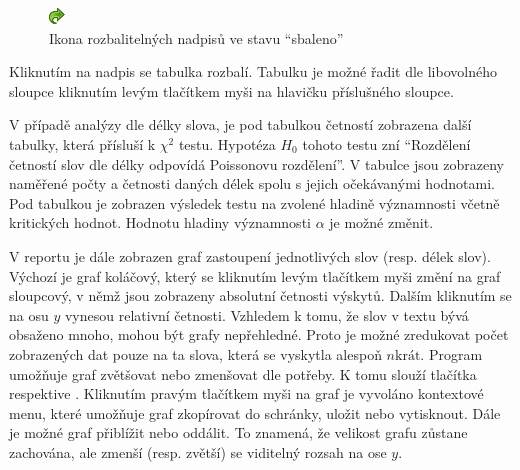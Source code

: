 \documentclass[dp.tex]{subfiles}
\begin{document}
\begin{figure}[H]
\centering
\includegraphics[max width=\textwidth,keepaspectratio=true]{imgs-60-aplikace/gui-toggle-healine}
\caption{Ikona rozbalitelných nadpisů ve stavu \enquote{sbaleno}}
\label{fig:gui-toggle-healine}
\end{figure}

Kliknutím na nadpis se tabulka rozbalí. Tabulku je možné řadit dle libovolného sloupce kliknutím levým tlačítkem myši na hlavičku příslušného sloupce.

V případě analýzy dle délky slova, je pod tabulkou četností zobrazena další tabulky, která přísluší k $\chi^2$ testu. Hypotéza $H_0$ tohoto testu zní \enquote{Rozdělení četností slov dle délky odpovídá Poissonovu rozdělení}. V tabulce jsou zobrazeny naměřené počty a četnosti daných délek spolu s jejich očekávanými hodnotami. Pod tabulkou je zobrazen výsledek testu na zvolené hladině významnosti včetně kritických hodnot. Hodnotu hladiny významnosti  $\alpha$ je možné změnit.

V reportu je dále zobrazen graf zastoupení jednotlivých slov (resp. délek slov). Výchozí je graf koláčový, který se kliknutím levým tlačítkem myši změní na graf sloupcový, v němž jsou zobrazeny absolutní četnosti výskytů. Dalším kliknutím se na osu $y$ vynesou relativní četnosti. Vzhledem k tomu, že slov v textu bývá obsaženo mnoho, mohou být grafy nepřehledné. Proto je možné zredukovat počet zobrazených dat pouze na ta slova, která se vyskytla alespoň $n\text{krát}$. Program umožňuje graf zvětšovat nebo zmenšovat dle potřeby. K tomu slouží tlačítka  respektive . Kliknutím pravým tlačítkem myši na graf je vyvoláno kontextové menu, které umožňuje graf zkopírovat do schránky, uložit nebo vytisknout. Dále je možné graf přiblížit nebo oddálit. To znamená, že velikost grafu zůstane zachována, ale zmenší (resp. zvětší) se viditelný rozsah na ose $y$.
\end{document}
